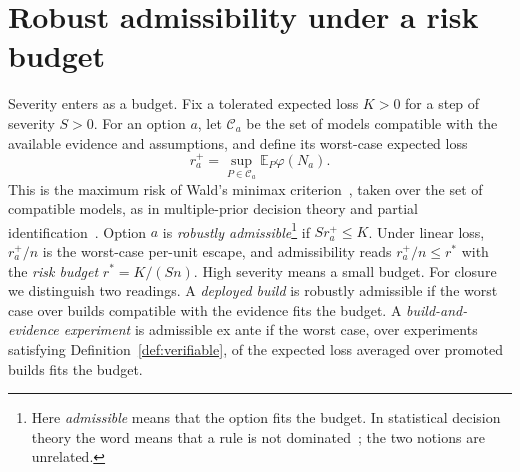 \documentclass[11pt]{article}
\theoremstyle{definition}
\theoremstyle{remark}
\newcommand{\E}{\mathbb E}
\begin{document}
\section{Robust admissibility under a risk budget}\label{sec:admissible}
Severity enters as a budget. Fix a tolerated expected loss $K>0$ for a step of severity $S>0$. For an
option $a$, let $\mathcal C_a$ be the set of models compatible with the available evidence and
assumptions, and define its worst-case expected loss
\[
r_a^+=\sup_{P\in\mathcal C_a}\E_P\varphi(N_a).
\]
This is the maximum risk of Wald's minimax criterion~\cite{wald45}, taken over the set of compatible models, as in multiple-prior
decision theory and partial identification~\cite{gilboa89,manski00}. Option $a$ is \emph{robustly
admissible}\footnote{Here \emph{admissible} means that the option fits the budget. In statistical
decision theory the word means that a rule is not dominated~\cite{wald45}; the two notions are
unrelated.} if $Sr_a^+\le K$. Under linear loss, $r_a^+/n$ is the
worst-case per-unit escape, and admissibility reads $r_a^+/n\le r^\ast$ with the \emph{risk budget}
$r^\ast=K/(Sn)$. High severity means a small budget. For closure we distinguish two readings. A
\emph{deployed build} is robustly admissible if the worst case over builds compatible with the
evidence fits the budget. A \emph{build-and-evidence experiment} is admissible ex ante if the worst
case, over experiments satisfying Definition~\ref{def:verifiable}, of the expected loss averaged over
promoted builds fits the budget.
\end{document}
